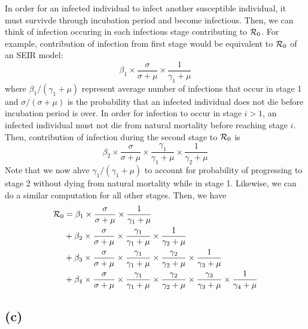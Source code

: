 \documentclass{article}
\begin{document}
In order for an infected individual to infect another susceptible individual, it must survivde through incubation period and become infectious. 
Then, we can think of infection occuring in each infectious stage contributing to ${\cal R}_0$. For example, contribution of infection from first stage would be equivalent to ${\cal R}_0$ of an SEIR model:
$$
\beta_1 \times \frac{\sigma}{\sigma + \mu} \times \frac{1}{\gamma_1 + \mu}
$$
where $\beta_1/(\gamma_1 + \mu)$ represent average number of infections that occur in stage 1 and $\sigma/(\sigma+\mu)$ is the probability that an infected individual does not die before incubation period is over.
In order for infection to occur in stage $i>1$, an infected individual must not die from natural mortality before reaching stage $i$. Then, contribution of infection during the second stage to ${\cal R}_0$ is
$$
\beta_2 \times \frac{\sigma}{\sigma + \mu} \times \frac{\gamma_1}{\gamma_1 + \mu} \times \frac{1}{\gamma_2 + \mu}
$$
Note that we now ahve $\gamma_1/(\gamma_1+\mu)$ to account for probability of progressing to stage 2 without dying from natural mortality while in stage 1.
Likewise, we can do a similar computation for all other stages. Then, we have
$$
\begin{aligned}
{\cal R}_0 &= \beta_1 \times \frac{\sigma}{\sigma + \mu} \times \frac{1}{\gamma_1 + \mu}\\
&+ \beta_2 \times \frac{\sigma}{\sigma + \mu} \times \frac{\gamma_1}{\gamma_1 + \mu} \times \frac{1}{\gamma_2 + \mu}\\
&+ \beta_3 \times \frac{\sigma}{\sigma + \mu} \times \frac{\gamma_1}{\gamma_1 + \mu} \times \frac{\gamma_2}{\gamma_2 + \mu} \times \frac{1}{\gamma_3 + \mu}\\
&+ \beta_4 \times \frac{\sigma}{\sigma + \mu} \times \frac{\gamma_1}{\gamma_1 + \mu} \times \frac{\gamma_2}{\gamma_2 + \mu} \times \frac{\gamma_3}{\gamma_3 + \mu} \times \frac{1}{\gamma_4 + \mu}\\
\end{aligned}
$$

\subsection*{(c)}
\end{document}
